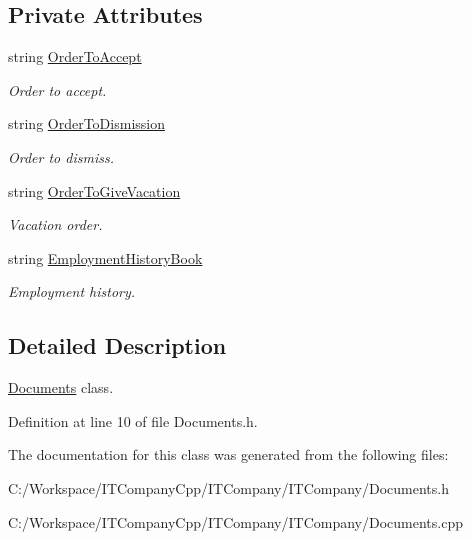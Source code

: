 \subsection*{Private Attributes}
\begin{DoxyCompactItemize}
\item 
\mbox{\label{class_documents_aeee4dc66716ab38efeae09702bc8feed}} 
string \hyperlink{class_documents_aeee4dc66716ab38efeae09702bc8feed}{Order\+To\+Accept}
\begin{DoxyCompactList}\small\item\em Order to accept. \end{DoxyCompactList}\item 
\mbox{\label{class_documents_a6d875e6e5ac48c55f9d9121ef302ac50}} 
string \hyperlink{class_documents_a6d875e6e5ac48c55f9d9121ef302ac50}{Order\+To\+Dismission}
\begin{DoxyCompactList}\small\item\em Order to dismiss. \end{DoxyCompactList}\item 
\mbox{\label{class_documents_ad55168aa0283ea51d965e732d52bee5a}} 
string \hyperlink{class_documents_ad55168aa0283ea51d965e732d52bee5a}{Order\+To\+Give\+Vacation}
\begin{DoxyCompactList}\small\item\em Vacation order. \end{DoxyCompactList}\item 
\mbox{\label{class_documents_ab78a87bb29b653f803e657e6406905b4}} 
string \hyperlink{class_documents_ab78a87bb29b653f803e657e6406905b4}{Employment\+History\+Book}
\begin{DoxyCompactList}\small\item\em Employment history. \end{DoxyCompactList}\end{DoxyCompactItemize}


\subsection{Detailed Description}
\hyperlink{class_documents}{Documents} class. 

Definition at line 10 of file Documents.\+h.



The documentation for this class was generated from the following files\+:\begin{DoxyCompactItemize}
\item 
C\+:/\+Workspace/\+I\+T\+Company\+Cpp/\+I\+T\+Company/\+I\+T\+Company/Documents.\+h\item 
C\+:/\+Workspace/\+I\+T\+Company\+Cpp/\+I\+T\+Company/\+I\+T\+Company/Documents.\+cpp\end{DoxyCompactItemize}
